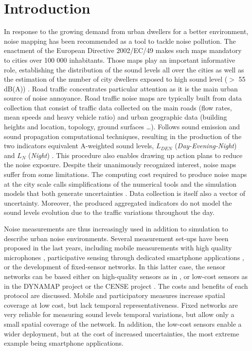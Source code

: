 \documentclass[review,5p,twocolumn,sort&compress,times]{elsarticle}
\begin{document}
\linenumbers

\section{Introduction}

In response to the growing demand from urban dwellers for a better environment, noise mapping has been recommended as a tool to tackle noise pollution. The enactment of the European Directive 2002/EC/49 makes such maps mandatory to cities over 100 000 inhabitants. Those maps play an important informative role, establishing the distribution of the sound levels all over the cities as well as the estimation of the number of city dwellers exposed to high sound level ($>$ 55 dB(A)) \cite{nugent2014noise}. Road traffic concentrates particular attention as it is the main urban source of noise annoyance. Road traffic noise maps are typically built from data collection that consist of traffic data collected on the main roads (flow rates, mean speeds and heavy vehicle ratio) and urban geographic data (building heights and location, topology, ground surfaces \dots). Follows sound emission and sound propagation computational techniques, resulting in the production of the two indicators equivalent A-weighted sound levels, $L_{DEN}$ (\textit{Day-Evening-Night}) and $L_N$ (\textit{Night}) \cite{kephalopoulos2012common}. This procedure also enables drawing up action plans to reduce the noise exposure. Despite their unanimously recognized interest, noise maps suffer from some limitations. The computing cost required to produce noise maps at the city scale calls simplifications of the numerical tools and the simulation models that both generate uncertainties \cite{van_leeuwen_noise_2015}. Data collection is itself also a vector of uncertainty. Moreover, the produced aggregated indicators do not model the sound levels evolution due to the traffic variations throughout the day.

Noise measurements are thus increasingly used in addition to simulation to describe urban noise environments. Several measurement set-ups have been proposed in the last years, including  mobile measurements with high quality microphones \cite{manvell2004sadmam, can2014measurement}, participative sensing through dedicated smartphone applications \cite{picaut:halshs-01565214, ventura2017evaluation}, or the development of fixed-sensor networks. In this latter case, the sensor networks can be based either on high-quality sensors as in \cite{mietlicki2012innovative, maijala2018environmental}, or low-cost sensors as in the DYNAMAP project \cite{dynamap_2016} or the CENSE project \cite{picaut2017characterization}. The costs and benefits of each protocol are discussed. Mobile and participatory measures increase spatial coverage at low cost, but lack temporal representativeness. Fixed networks are very reliable for measuring sound levels temporal variations, but allow only a small spatial coverage of the network. In addition, the low-cost sensors enable a wider deployment, but at the cost of increased uncertainties, the most extreme example being smartphone applications.
\end{document}
